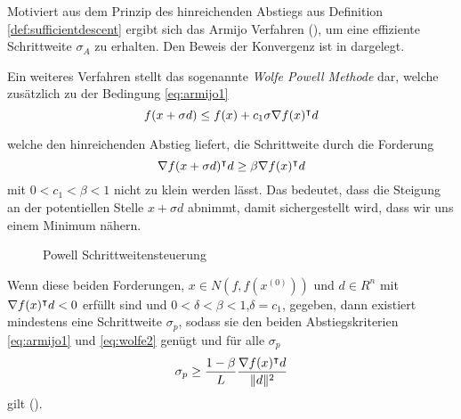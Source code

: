 Motiviert aus dem Prinzip des hinreichenden Abstiegs aus Definition \ref{def:sufficientdescent} ergibt sich das Armijo Verfahren (\cite[Verfahren 4.5.4]{alt2002nichtlineare}), um eine effiziente Schrittweite $\sigma_A$ zu erhalten.   
Den Beweis der Konvergenz ist in  \cite[Satz 4.5.5]{alt2002nichtlineare} dargelegt.

Ein weiteres Verfahren stellt das sogenannte \textit{Wolfe Powell Methode} dar, welche zusätzlich zu der Bedingung \eqref{eq:armijo1}
\begin{equation}
 f(x+\sigma d) \leq f(x) + c_1\sigma \nabla f(x)^\intercal d
\end{equation}

welche den hinreichenden Abstieg liefert, die Schrittweite durch die Forderung
\begin{equation}
\label{eq:wolfe2}
 \nabla f(x+\sigma d)^\intercal d\geq \beta \nabla f(x)^\intercal d
\end{equation}
mit $0<c_1<\beta<1$ nicht zu klein werden lässt. Das bedeutet, dass die Steigung an der potentiellen Stelle $x+\sigma d$ abnimmt, damit sichergestellt wird, dass wir uns einem Minimum nähern. 

\begin{figure}
\centering

\caption{Powell Schrittweitensteuerung}
\label{fig:powell}
\end{figure}
Wenn diese beiden Forderungen, $x\in N(f,f(x^{(0)}))$ und $d\in R^n$ mit $\nabla f(x)^\intercal d<0$ erfüllt sind und $0<\delta<\beta<1$,$\delta =c_1$, gegeben, dann existiert mindestens eine Schrittweite $\sigma_p$, sodass sie den beiden Abstiegskriterien \eqref{eq:armijo1} und \eqref{eq:wolfe2} genügt und für alle $\sigma_p$
\[
 \sigma_p \geq \frac{1-\beta}{L}\frac{\nabla f(x)^\intercal d}{\|d\|^2}
\]
gilt (\cite[Satz 4.5.8.]{alt2002nichtlineare}).

